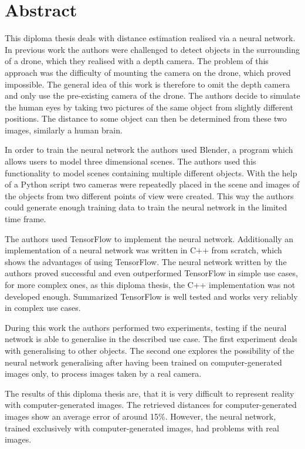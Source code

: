\chapter{Abstract}

This diploma thesis deals with distance estimation realised via a neural network. In previous work the authors were challenged to detect objects in the surrounding of a drone, which they realised with a depth camera. The problem of this approach was the difficulty of mounting the camera on the drone, which proved impossible. The general idea of this work is therefore to omit the depth camera and only use the pre-existing camera of the drone. The authors decide to simulate the human eyes by taking two pictures of the same object from slightly different positions. The distance to some object can then be determined from these two images, similarly a human brain.

In order to train the neural network the authors used Blender, a program which allows users to model three dimensional scenes. The authors used this functionality to model scenes containing multiple different objects. With the help of a Python script two cameras were repeatedly placed in the scene and images of the objects from two different points of view were created. This way the authors could generate enough training data to train the neural network in the limited time frame.

The authors used TensorFlow to implement the neural network. Additionally an implementation of a neural network was written in C++ from scratch, which shows the advantages of using TensorFlow. The neural network written by the authors proved successful and even outperformed TensorFlow in simple use cases, for more complex ones, as this diploma thesis, the C++ implementation was not developed enough. Summarized TensorFlow is well tested and works very reliably in complex use cases.

During this work the authors performed two experiments, testing if the neural network is able to generalise in the described use case. The first experiment deals with generalising to other objects. The second one explores the possibility of the neural network generalising after having been trained on computer-generated images only, to process images taken by a real camera.

The results of this diploma thesis are, that it is very difficult to represent reality with computer-generated images. The retrieved distances for computer-generated images show an average error of around 15\%. However, the neural network, trained exclusively with computer-generated images, had problems with real images.